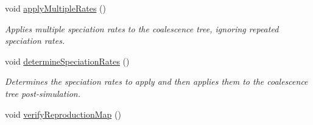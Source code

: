 \begin{DoxyCompactItemize}
void \hyperlink{class_tree_acfc7efdec999f6dbf2ac089514d22091}{apply\+Multiple\+Rates} ()
\begin{DoxyCompactList}\small\item\em Applies multiple speciation rates to the coalescence tree, ignoring repeated speciation rates. \end{DoxyCompactList}\item 
void \hyperlink{class_tree_a25f082da13789dfa3fefcbcfd08b4dfe}{determine\+Speciation\+Rates} ()
\begin{DoxyCompactList}\small\item\em Determines the speciation rates to apply and then applies them to the coalescence tree post-\/simulation. \end{DoxyCompactList}\item 
void \hyperlink{class_tree_ae07582bb85bff9bbb3f204c1066df9cc}{verify\+Reproduction\+Map} ()\hypertarget{class_tree_ae07582bb85bff9bbb3f204c1066df9cc}{}\label{class_tree_ae07582bb85bff9bbb3f204c1066df9cc}


\end{DoxyCompactItemize}

